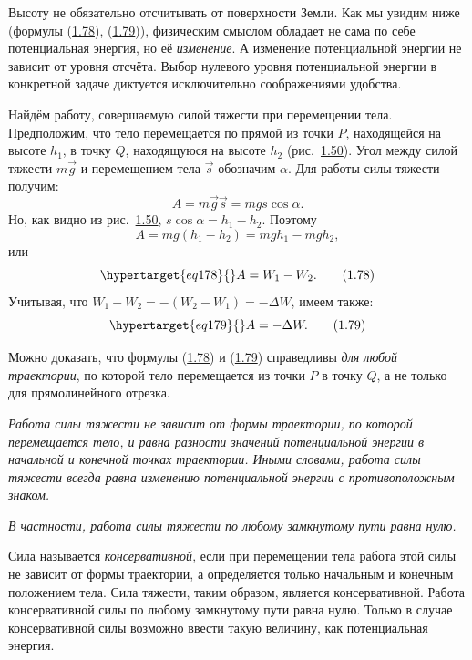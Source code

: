 Высоту не обязательно отсчитывать от поверхности Земли. Как мы увидим ниже (формулы (\hyperlink{eq178}{1.78}), (\hyperlink{eq179}{1.79})), фи\-зическим смыслом обладает не сама по себе потенциаль\-ная энергия, но её \textit{изменение}. А изменение потенциаль\-ной энер\-гии не зависит от уровня отсчёта. Выбор нуле\-вого уровня потенциаль\-ной энер\-гии в конкретной задаче диктуется исключительно соображениями удобства.

Найдём работу, совершаемую силой тяже\-сти при перемещении тела. Предположим, что тело перемещается по прямой из точки $P$, находящейся на высоте $h_1$, в точку $Q$, находящуюся на высоте $h_2$ (рис.~\hyperlink{fig150}{1.50}).
\newpage
Угол между силой тяже\-сти $m\vec g$ и перемещением тела $\vec s$ обозначим $\alpha$. Для работы силы тяже\-сти получим:
\[
A=m\vec g\vec s=mgs\cos\alpha.
\]
\noindent Но, как видно из рис.~\hyperlink{fig150}{1.50}, $s\cos\alpha=h_1-h_2$. Поэтому
\[
A=mg(h_1-h_2)=mgh_1-mgh_2,
\]
\noindent или
\begin{equation}\hypertarget{eq178}{}A=W_1-W_2.\tag{1.78}\end{equation}
\noindent Учитывая, что $W_1-W_2=-(W_2-W_1)=-\Delta W$, имеем также:
\begin{equation}\hypertarget{eq179}{}A=-\Delta W.\tag{1.79}\end{equation}

Можно доказать, что формулы (\hyperlink{eq178}{1.78}) и (\hyperlink{eq179}{1.79}) справедливы \textit{для любой тра\-ек\-тории}, по ко\-торой тело перемещается из точки $P$ в точку $Q$, а не только для прямолинейного отрезка.

\vspace{5.165pt}
\textit{Работа силы тяже\-сти не зависит от формы тра\-ек\-тории, по ко\-торой перемещается те\-ло, и равна разности значений потенциаль\-ной энер\-гии в начальной и конечной точках тра\-ек\-тории. Иными словами, работа силы тяже\-сти всегда равна изменению потенциаль\-ной энер\-гии с противоположным знаком.}

\textit{В частности, работа силы тяже\-сти по любому замкнутому пути равна нулю.}

\vspace{5.165pt}
Сила называется \textit{консервативной}, если при перемещении тела работа этой силы не зависит от формы тра\-ек\-тории, а определяется только начальным и конечным положением тела. Сила тяже\-сти, таким образом, является консервативной. Работа консервативной силы по любому замкнутому пути равна нулю. Только в случае консервативной силы возможно ввести такую величину, как потенциаль\-ная энергия.


